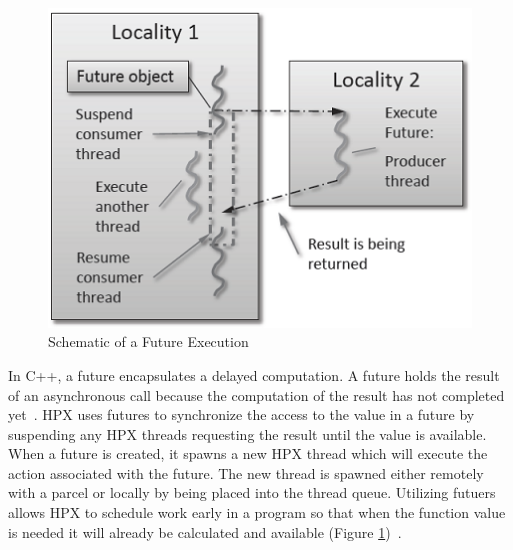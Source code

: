 \begin{figure}[h!]
\centering
\includegraphics[scale=1]{images/future_schematics.png}
\caption[Schematic of a Future Execution]{Schematic of a Future Execution~\cite{kaiser2009parallex}}
\label{fig:future_schematics}
\end{figure}
In C++, a future encapsulates a delayed computation. A future holds the result of an asynchronous call because the computation of the result has not completed yet~\cite{stroustrup2013c++}. HPX uses futures to synchronize the access to the value in a future by suspending any HPX threads requesting the result until the value is available. When a future is created, it spawns a new HPX thread which will execute the action associated with the future. The new thread is spawned either remotely with a parcel or locally by being placed into the thread queue.  Utilizing futuers allows HPX to schedule work early in a program so that when the function value is needed it will already be calculated and available (Figure \ref{fig:future_schematics})~\cite{kaiser2009parallex}.
